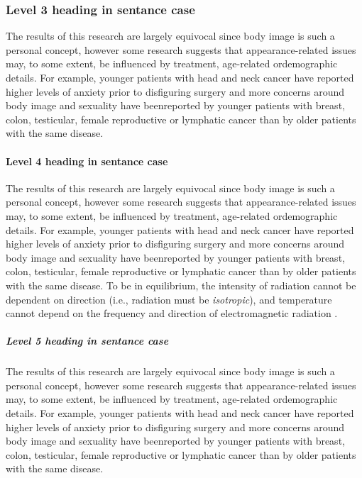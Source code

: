 \documentclass[onecolumn,authoryear]{els-mrw}
\begin{document}
\subsubsection{Level 3 heading in sentance case}\label{chap1:subsubsec1}

The results of this research are largely equivocal since body image is such a personal
concept, however some research suggests that appearance-related issues may, to some
extent, be influenced by treatment, age-related ordemographic details. For example,
younger patients with head and neck cancer have reported higher levels of anxiety
prior to disfiguring surgery and more concerns around body image \cite{bib3} and sexuality have
beenreported by younger patients with breast, colon, testicular, female reproductive or
lymphatic cancer than by older patients with the same disease.

\paragraph{Level 4 heading in sentance case}

The results of this research are largely equivocal since body image is such a personal
concept, however some research suggests that appearance-related issues may, to some
extent, be influenced by treatment, age-related ordemographic details. For example,
younger patients with head and neck cancer have reported higher levels of anxiety
prior to disfiguring surgery and more concerns around body image and sexuality have
beenreported by younger patients with breast, colon, testicular, female reproductive or
lymphatic cancer than by older patients with the same disease. To be in equilibrium, the intensity
of radiation cannot be dependent on direction (i.e., radiation must be
\emph{isotropic}), and temperature cannot depend on the frequency and
direction of electromagnetic radiation \cite{bib4}.

\subparagraph{Level 5 heading in sentance case}%

The results of this research are largely equivocal since body image is such a personal
concept, however some research suggests that appearance-related issues may, to some
extent, be influenced by treatment, age-related ordemographic details. For example,
younger patients with head and neck cancer have reported higher levels of anxiety
prior to disfiguring surgery and more concerns around body image and sexuality have
beenreported by younger patients with breast, colon, testicular, female reproductive or
lymphatic cancer than by older patients with the same disease.
\end{document}
